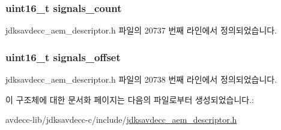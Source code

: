 \subsubsection[{\texorpdfstring{signals\+\_\+count}{signals_count}}]{\setlength{\rightskip}{0pt plus 5cm}uint16\+\_\+t signals\+\_\+count}\hypertarget{structjdksavdecc__descriptor__matrix__signal_aa06daacf08fd67693f794aedf330942b}{}\label{structjdksavdecc__descriptor__matrix__signal_aa06daacf08fd67693f794aedf330942b}


jdksavdecc\+\_\+aem\+\_\+descriptor.\+h 파일의 20737 번째 라인에서 정의되었습니다.

\subsubsection[{\texorpdfstring{signals\+\_\+offset}{signals_offset}}]{\setlength{\rightskip}{0pt plus 5cm}uint16\+\_\+t signals\+\_\+offset}\hypertarget{structjdksavdecc__descriptor__matrix__signal_a7b876bd908f8076038ffd84de9845183}{}\label{structjdksavdecc__descriptor__matrix__signal_a7b876bd908f8076038ffd84de9845183}


jdksavdecc\+\_\+aem\+\_\+descriptor.\+h 파일의 20738 번째 라인에서 정의되었습니다.



이 구조체에 대한 문서화 페이지는 다음의 파일로부터 생성되었습니다.\+:\begin{DoxyCompactItemize}
\item 
avdecc-\/lib/jdksavdecc-\/c/include/\hyperlink{jdksavdecc__aem__descriptor_8h}{jdksavdecc\+\_\+aem\+\_\+descriptor.\+h}\end{DoxyCompactItemize}
